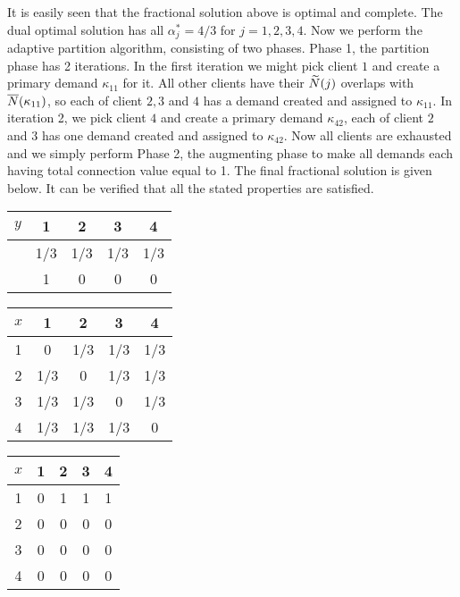 \documentclass{article}
\begin{document}
It is easily seen that the fractional solution above is
optimal and complete. The dual optimal solution has all
$\alpha_j^\ast = 4/3$ for $j=1,2,3,4$. Now we perform the
adaptive partition algorithm, consisting of two
phases. Phase 1, the partition phase has 2 iterations. In
the first iteration we might pick client $1$ and create a
primary demand $\kappa_{11}$ for it. All other clients have
their ${\widetilde N}(j)$ overlaps with ${\overline{N}}(\kappa_{11})$, so
each of client $2,3$ and $4$ has a demand created and
assigned to $\kappa_{11}$. In iteration 2, we pick client
$4$ and create a primary demand $\kappa_{42}$, each of
client $2$ and $3$ has one demand created and assigned to
$\kappa_{42}$. Now all clients are exhausted and we simply
perform Phase 2, the augmenting phase to make all demands
each having total connection value equal to 1. The final
fractional solution is given below. It can be verified that
all the stated properties are satisfied.
\begin{table}[ht,center]
  \begin{subtable}{0.3\textwidth}
  \centering
  \begin{tabular}{c | c c c c}
    $y$ & 1 & 2 & 3 & 4\\
    \hline
    & 1/3 & 1/3 & 1/3 & 1/3\\
    & 1 & 0 & 0 & 0\\
  \end{tabular}
\end{subtable}
%
\begin{subtable}{0.3\textwidth}
  \centering
  \begin{tabular}{c | c c c c}
    $x$ & 1 & 2 & 3 & 4\\
    \hline
    1 & 0 & 1/3 & 1/3 & 1/3\\
    2 & 1/3 & 0 & 1/3 & 1/3\\
    3 & 1/3 & 1/3 & 0 & 1/3\\
    4 & 1/3 & 1/3 & 1/3 & 0\\
  \end{tabular}
\end{subtable}
%
\begin{subtable}{0.3\textwidth}
  \centering
  \begin{tabular}{c | c c c c}
    $x$ & 1 & 2 & 3 & 4\\
    \hline
    1 & 0 & 1 & 1 & 1\\
    2 & 0 & 0 & 0 & 0\\
    3 & 0 & 0 & 0 & 0\\
    4 & 0 & 0 & 0 & 0\\
  \end{tabular}
\end{subtable}
\end{table}
\end{document}

